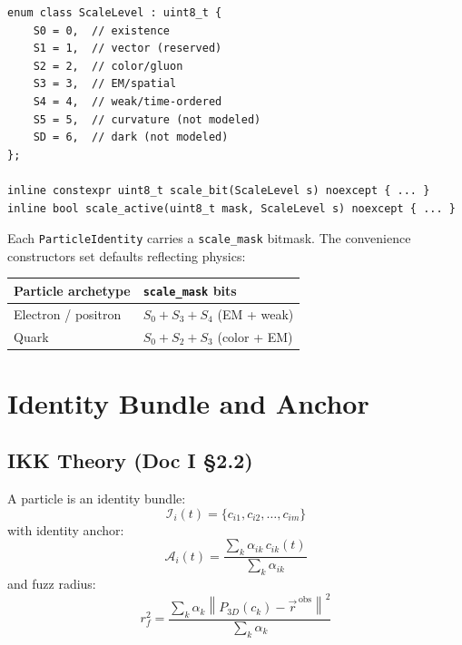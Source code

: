 \documentclass[11pt, a4paper, oneside]{article}
\newcommand{\Id}{\mathcal{I}}
\newcommand{\Anch}{\mathcal{A}}
\theoremstyle{definition}
\theoremstyle{remark}
\begin{document}
\begin{lstlisting}[caption={ScaleLevel enum and helpers in identity\_matrix.hpp}]
enum class ScaleLevel : uint8_t {
	S0 = 0,  // existence
	S1 = 1,  // vector (reserved)
	S2 = 2,  // color/gluon
	S3 = 3,  // EM/spatial
	S4 = 4,  // weak/time-ordered
	S5 = 5,  // curvature (not modeled)
	SD = 6,  // dark (not modeled)
};

inline constexpr uint8_t scale_bit(ScaleLevel s) noexcept { ... }
inline bool scale_active(uint8_t mask, ScaleLevel s) noexcept { ... }
\end{lstlisting}

Each \texttt{ParticleIdentity} carries a \texttt{scale\_mask} bitmask.  The
convenience constructors set defaults reflecting physics:

\begin{center}
  \begin{tabular}{l l}
	\toprule
	Particle archetype & \texttt{scale\_mask} bits \\
	\midrule
	Electron / positron & $S_0 + S_3 + S_4$ (EM + weak) \\
	Quark               & $S_0 + S_2 + S_3$ (color + EM) \\
	\bottomrule
  \end{tabular}
\end{center}

\section{Identity Bundle and Anchor}

\subsection{IKK Theory (Doc I \S2.2)}

A particle is an identity bundle:
\begin{equation}
  \Id_i(t) = \{c_{i1}, c_{i2}, \ldots, c_{im}\}
\end{equation}
with identity anchor:
\begin{equation}
  \Anch_i(t)
  = \frac{\sum_k \alpha_{ik}\, c_{ik}(t)}{\sum_k \alpha_{ik}}
  \label{eq:anchor}
\end{equation}
and fuzz radius:
\begin{equation}
  r_f^2
  = \frac{\sum_k \alpha_k \left\|P_{3D}(c_k) - \vec{r}^{\,\text{obs}}\right\|^2}
		 {\sum_k \alpha_k}
  \label{eq:fuzz}
\end{equation}
\end{document}
